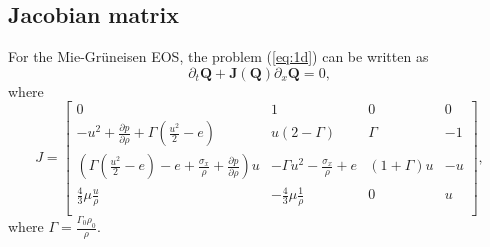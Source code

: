\documentclass{article}
\numberwithin{equation}{section}
\numberwithin{table}{section}
\begin{document}
\subsection{Jacobian matrix} %
For the Mie-Gr\"uneisen EOS, the problem (\ref{eq:1d}) can be written as
\begin{equation}
  \partial _t \bm{Q} +\bm{J}(\bm{Q})\partial_x\bm{Q} = 0,
\end{equation}
where
\begin{equation}\label{eq:Jcb}
  J = \left[\begin{array}{llll}
	  0 & 1 & 0 & 0 \\
	  -u^2 + \frac{\partial p}{\partial \rho} +\Gamma(\frac{u^2}{2}-e)& u(2-\Gamma)& \Gamma & -1 \\
	  (\Gamma(\frac{u^2}{2}-e)-e+\frac{\sigma_x}{\rho}+\frac{\partial p}{\partial \rho})u & -\Gamma u^2 -\frac{\sigma_x}{\rho} +e & (1+\Gamma)u& -u\\
	\frac{4}{3}\mu\frac{u}{\rho} & -\frac{4}{3}\mu\frac{1}{\rho}& 0 & u \\
\end{array}
\right],
\end{equation}
where $\Gamma = \frac{\Gamma_0\rho_0}{\rho} $.
\end{document}
